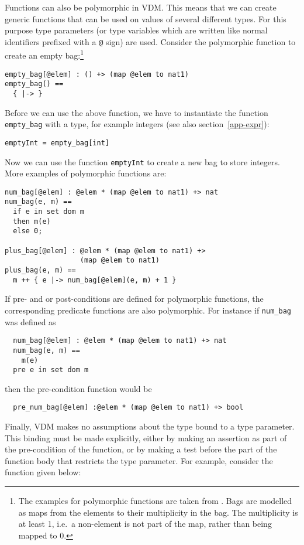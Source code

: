 \documentclass{overturerepchap}
\begin{document}
Functions can also be polymorphic in VDM. This means that we can create
generic functions that can be used on values of several different
types. For this purpose type parameters (or type variables which are
written like normal identifiers prefixed with a {\tt @} sign) are
used. Consider the polymorphic function to create an empty
bag:\footnote{The examples for polymorphic functions are taken from
\cite{Dawes91}. Bags are modelled as maps from the elements to their
multiplicity in the bag. The multiplicity is at least 1, i.e.\ a
non-element is not part of the map, rather than being mapped to 0.}
\begin{lstlisting}
empty_bag[@elem] : () +> (map @elem to nat1)
empty_bag() ==
  { |-> }
\end{lstlisting}
Before we can use the above function, we have to instantiate the
function {\tt empty\_bag} with a type, for example integers (see also
section~\ref{app-expr}):
\begin{lstlisting}
emptyInt = empty_bag[int]
\end{lstlisting}
Now we can use the function {\tt emptyInt} to create a new bag to store
integers. More examples of polymorphic functions are:
\begin{lstlisting}
num_bag[@elem] : @elem * (map @elem to nat1) +> nat
num_bag(e, m) ==
  if e in set dom m
  then m(e)
  else 0;

plus_bag[@elem] : @elem * (map @elem to nat1) +>
                  (map @elem to nat1)
plus_bag(e, m) ==
  m ++ { e |-> num_bag[@elem](e, m) + 1 }
\end{lstlisting}
If pre- and or post-conditions are defined for polymorphic functions, the
corresponding predicate functions are also polymorphic. For instance
if \texttt{num\_bag} was defined as
\begin{lstlisting}
  num_bag[@elem] : @elem * (map @elem to nat1) +> nat
  num_bag(e, m) ==
    m(e)
  pre e in set dom m
\end{lstlisting}
then the pre-condition function would be
\begin{lstlisting}
  pre_num_bag[@elem] :@elem * (map @elem to nat1) +> bool
\end{lstlisting}

\noindent Finally, VDM makes no assumptions about the type bound to a type parameter. This binding must be made explicitly, either by making an assertion as part of the pre-condition of the function, or by making a test before the part of the function body that restricts the type parameter. For example, consider the function given below:
\end{document}

